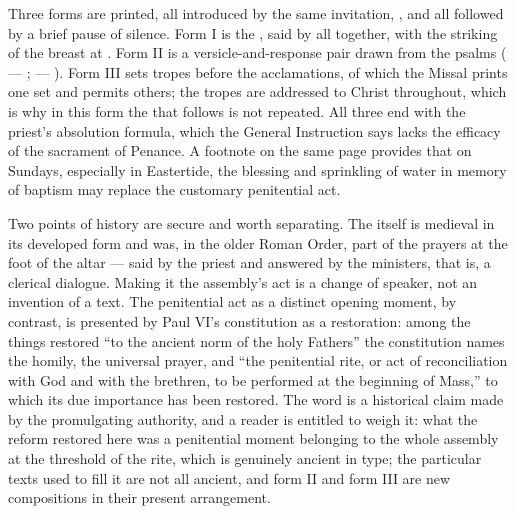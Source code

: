 Three forms are printed, all introduced by the same invitation, , and all followed by a brief pause
of silence. Form I is the , said by all together, with the striking of the
breast at . Form II is a versicle-and-response
pair drawn from the psalms ( --- ;
 --- ). Form
III sets tropes before the  acclamations, of which the Missal prints one set and
permits others; the tropes are addressed to Christ throughout, which is why in this form the
 that follows is not repeated. All three end with the priest's absolution formula,
which the General Instruction says lacks the efficacy of the sacrament of
Penance. A
footnote on the same page provides that on Sundays, especially in Eastertide, the blessing and
sprinkling of water in memory of baptism may replace the customary penitential act.

Two points of history are secure and worth separating. The  itself is medieval
in its developed form and was, in the older Roman Order, part of the prayers at the foot of the
altar --- said by the priest and answered by the ministers, that is, a clerical dialogue.
Making it the assembly's act is a change of speaker, not an invention of a text. The
penitential act as a distinct opening moment, by contrast, is presented by Paul VI's
constitution as a restoration: among the things restored ``to the ancient norm of the holy
Fathers'' the constitution names the homily, the universal prayer, and ``the penitential rite,
or act of reconciliation with God and with the brethren, to be performed at the beginning of
Mass,'' to which its due importance has been restored.
The word  is a historical claim made by the promulgating authority, and a
reader is entitled to weigh it: what the reform restored here was a penitential moment
belonging to the whole assembly at the threshold of the rite, which is genuinely ancient in
type; the particular texts used to fill it are not all ancient, and form II and form III are
new compositions in their present arrangement.


